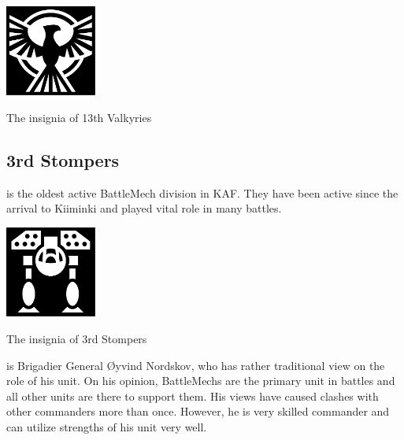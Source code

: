 \documentclass{tufte-book}
\begin{document}
\bigskip
{}

\begin{marginfigure}[0\baselineskip]
  \includegraphics[width=3cm]{condor-emblem}
  \caption{The insignia of 13th Valkyries}
  \label{fig:valkyries}
\end{marginfigure}


\subsection{3rd Stompers}

 is the oldest active BattleMech division in KAF.
They have been active since the arrival to Kiiminki and played vital role in
many battles.

\begin{marginfigure}[0\baselineskip]
  \includegraphics[width=3cm]{missile-mech}
  \caption{The insignia of 3rd Stompers}
  \label{fig:stompers}
\end{marginfigure}

 is Brigadier General \O yvind
Nordskov, who has rather traditional view on the role of his unit. On his
opinion, BattleMechs are the primary unit in battles and all other units are
there to support them. His views have caused clashes with other commanders
more than once. However, he is very skilled commander and can utilize
strengths of his unit very well.
\end{document}
